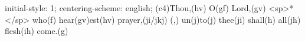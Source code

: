 initial-style: 1;
centering-scheme: english;
(c4)Thou,(hv) O(gf) Lord,(gv) <sp>*</sp> who(f) hear(gv)est(hv) prayer,(ji/jkj) (,) un(j)to(j) thee(ji) shall(h) all(jh) flesh(ih) come.(g)

